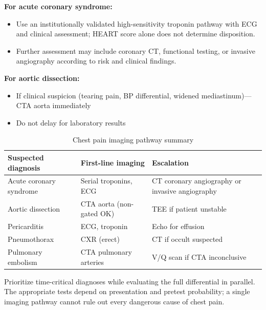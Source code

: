 \textbf{For acute coronary syndrome:}
\begin{itemize}
    \item Use an institutionally validated high-sensitivity troponin pathway with ECG and clinical assessment; HEART score alone does not determine disposition.
    \item Further assessment may include coronary CT, functional testing, or invasive angiography according to risk and clinical findings.
\end{itemize}

\textbf{For aortic dissection:}
\begin{itemize}
    \item If clinical suspicion (tearing pain, BP differential, widened mediastinum)---CTA aorta immediately
    \item Do not delay for laboratory results
\end{itemize}

\begin{table}[h]
\centering
\caption{Chest pain imaging pathway summary}
\begin{tabular}{|p{}|p{}|p{}|}
\hline
\textbf{Suspected diagnosis} & \textbf{First-line imaging} & \textbf{Escalation} \\
\hline
Acute coronary syndrome & Serial troponins, ECG & CT coronary angiography or invasive angiography \\
\hline
Aortic dissection & CTA aorta (non-gated OK) & TEE if patient unstable \\
\hline
Pericarditis & ECG, troponin & Echo for effusion \\
\hline
Pneumothorax & CXR (erect) & CT if occult suspected \\
\hline
Pulmonary embolism & CTA pulmonary arteries & V/Q scan if CTA inconclusive \\
\hline
\end{tabular}
\end{table}

\begin{pearlbox}
Prioritize time-critical diagnoses while evaluating the full differential in parallel. The appropriate tests depend on presentation and pretest probability; a single imaging pathway cannot rule out every dangerous cause of chest pain.
\end{pearlbox}

\clearpage


